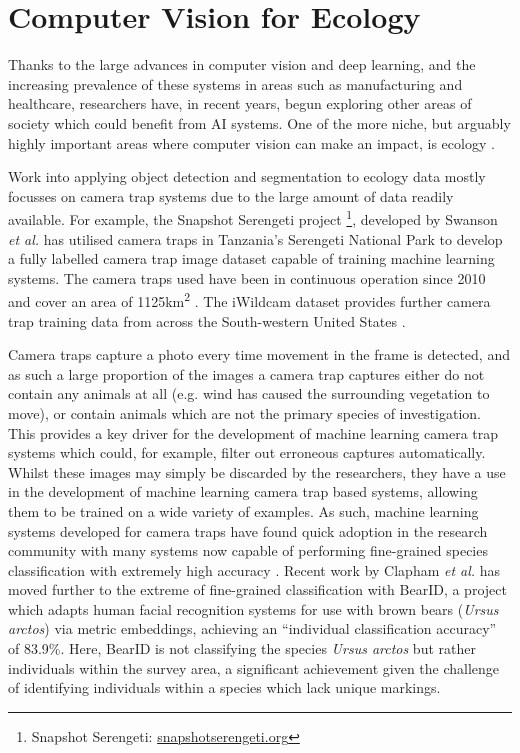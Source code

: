 \section{Computer Vision for Ecology}\label{ch:Background,sec:conTech}

Thanks to the large advances in computer vision and deep learning, and the increasing prevalence of these systems in areas such as manufacturing and healthcare, researchers have, in recent years, begun exploring other areas of society which could benefit from AI systems. One of the more niche, but arguably highly important areas where computer vision can make an impact, is ecology \cite{weinstein_computer_2018}.

Work into applying object detection and segmentation to ecology data mostly focusses on camera trap systems due to the large amount of data readily available. For example, the Snapshot Serengeti project \footnote{Snapshot Serengeti: \href{https://www.snapshotserengeti.org/}{snapshotserengeti.org}}, developed by Swanson \textit{et al.} has utilised camera traps in Tanzania's Serengeti National Park to develop a fully labelled camera trap image dataset capable of training machine learning systems. The camera traps used have been in continuous operation since 2010 and cover an area of 1125km\textsuperscript{2} \cite{swanson_snapshot_2015}. The iWildcam dataset provides further camera trap training data from across the South-western United States \cite{beery_iwildcam_2019}.

Camera traps capture a photo every time movement in the frame is detected, and as such a large proportion of the images a camera trap captures either do not contain any animals at all (e.g. wind has caused the surrounding vegetation to move), or contain animals which are not the primary species of investigation. This provides a key driver for the development of machine learning camera trap systems which could, for example, filter out erroneous captures automatically. Whilst these images may simply be discarded by the researchers, they have a use in the development of machine learning camera trap based systems, allowing them to be trained on a wide variety of examples. As such, machine learning systems developed for camera traps have found quick adoption in the research community with many systems now capable of performing fine-grained species classification with extremely high accuracy \cite{tabak_machine_2019, norouzzadeh_automatically_2018, willi_identifying_2019, beery_efficient_2019, norouzzadeh_deep_2019}. Recent work by Clapham \textit{et al.} \cite{clapham_automated_2020} has moved further to the extreme of fine-grained classification with BearID, a project which adapts human facial recognition systems for use with brown bears (\textit{Ursus arctos}) via metric embeddings, achieving an ``individual classification accuracy'' of 83.9\%. Here, BearID is not classifying the species \textit{Ursus arctos} but rather individuals within the survey area, a significant achievement given the challenge of identifying individuals within a species which lack unique markings.

